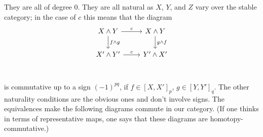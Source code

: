 \documentclass[../main]{subfiles}
\begin{document}
They are all of degree 0.
They are all natural as $X$, $Y$, and $Z$ vary over the stable category;
in the case of $c$ this means that the diagram
\[
\begin{tikzcd}
    X \wedge Y & X \wedge Y \\
    X' \wedge Y' & Y' \wedge X' \\
    \arrow[from=1-1, to=1-2, "c"]
    \arrow[from=1-1, to=2-1, "f \wedge g"]
    \arrow[from=1-2, to=2-2, "g \wedge f"]
    \arrow[from=2-1, to=2-2, "c"] 
\end{tikzcd}
\]
is commutative up to a sign $(-1)^{pq}$, if $f \in [X, X']_p$, $g \in [Y, Y']_q$.
The other naturality conditions are the obvious ones and don't involve signs.
The equivalences make the following diagrams commute in our category.
(If one thinks in terms of representative maps, one says that these diagrams are homotopy-commutative.)
\end{document}
